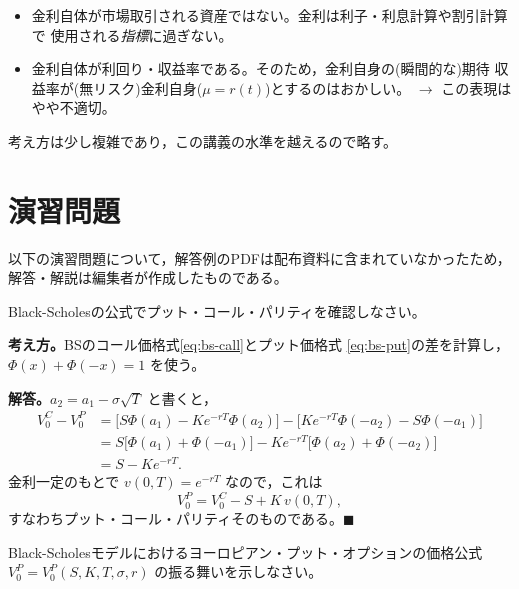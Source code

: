 \begin{itemize}
\item 金利自体が市場取引される資産ではない。金利は利子・利息計算や割引計算で
使用される\emph{指標}に過ぎない。
\item 金利自体が利回り・収益率である。そのため，金利自身の(瞬間的な)期待
収益率が(無リスク)金利自身($\mu = r(t)$)とするのはおかしい。
$\to$ この表現はやや不適切。
\end{itemize}
考え方は少し複雑であり，この講義の水準を越えるので略す。

\section{演習問題}

以下の演習問題について，解答例のPDFは配布資料に含まれていなかったため，
解答・解説は編集者が作成したものである。

\begin{exercise}[問題12-1]
Black-Scholesの公式でプット・コール・パリティを確認しなさい。
\end{exercise}

\begin{answerbox}
\textbf{考え方。}BSのコール価格式\eqref{eq:bs-call}とプット価格式
\eqref{eq:bs-put}の差を計算し，$\Phi(x) + \Phi(-x) = 1$ を使う。

\medskip
\textbf{解答。}$a_2 = a_1 - \sigma\sqrt{T}$ と書くと，
\begin{align*}
V_0^C - V_0^P
&= \bigl[S\Phi(a_1) - Ke^{-rT}\Phi(a_2)\bigr]
- \bigl[Ke^{-rT}\Phi(-a_2) - S\Phi(-a_1)\bigr]\\
&= S\bigl[\Phi(a_1) + \Phi(-a_1)\bigr]
- Ke^{-rT}\bigl[\Phi(a_2) + \Phi(-a_2)\bigr]\\
&= S - Ke^{-rT}.
\end{align*}
金利一定のもとで $v(0,T) = e^{-rT}$ なので，これは
\[
V_0^P = V_0^C - S + K\,v(0,T),
\]
すなわちプット・コール・パリティそのものである。$\blacksquare$
\end{answerbox}

\begin{exercise}[問題12-2]
Black-Scholesモデルにおけるヨーロピアン・プット・オプションの価格公式
$V_0^P = V_0^P(S,K,T,\sigma,r)$ の振る舞いを示しなさい。
\end{exercise}


